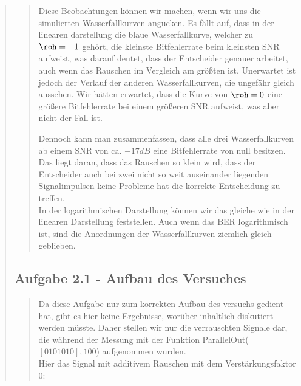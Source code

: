 \begin{quote}
\begin{quote}
                \vspace{2em}
    
    Diese Beobachtungen können wir machen, wenn wir uns die simulierten
    Wasserfallkurven angucken. Es fällt auf, dass in der linearen
    darstellung die blaue Wasserfallkurve, welcher zu $\roh = -1$ gehört, die
    kleinste Bitfehlerrate beim kleinsten SNR aufweist, was darauf deutet, dass
    der Entscheider genauer arbeitet, auch wenn das Rauschen im Vergleich am
    größten ist. Unerwartet ist jedoch der Verlauf der anderen Wasserfallkurven,
    die ungefähr gleich aussehen. Wir hätten erwartet, dass die Kurve von $\roh
    = 0$ eine größere Bitfehlerrate bei einem größeren SNR aufweist, was aber
    nicht der Fall ist. 
    
    
    Dennoch kann man zusammenfassen, dass alle drei Wasserfallkurven ab einem
    SNR von ca. $-17 dB$ eine Bitfehlerrate von null besitzen. Das liegt daran,
    dass das Rauschen so klein wird, dass der Entscheider auch bei zwei nicht so
    weit auseinander liegenden Signalimpulsen keine Probleme hat die korrekte
    Entscheidung zu treffen.\\
    
    In der logarithmischen Darstellung können wir das gleiche wie in der
    linearen Darstellung feststellen. Auch wenn das BER logarithmisch ist, sind
    die Anordnungen der Wasserfallkurven ziemlich gleich geblieben.
                
    \end{quote}  %
    
    \subsection{Aufgabe 2.1 - Aufbau des Versuches}
    \begin{quote}
        
        Da diese Aufgabe nur zum korrekten Aufbau des versuchs gedient hat, gibt
        es hier keine Ergebnisse, worüber inhaltlich diskutiert werden müsste.
        Daher stellen wir nur die verrauschten Signale dar, die während der
        Messung mit der Funktion ParallelOut($[0 1 0 1 0 1 0],100$) aufgenommen
        wurden.\\
        
        Hier das Signal mit additivem Rauschen mit dem Verstärkungsfaktor $0$:
        

\end{quote}
\end{quote}
